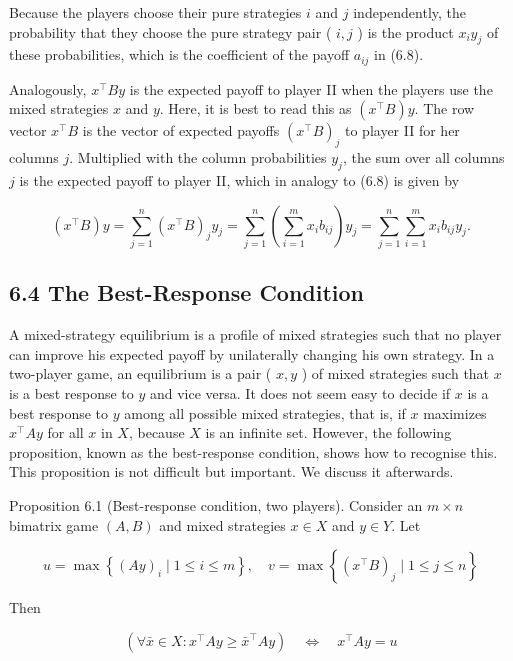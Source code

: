 \documentclass[12pt]{article}
\begin{document}
Because the players choose their pure strategies $i$ and $j$ independently, the probability that they choose the pure strategy pair ( $i, j$ ) is the product $x_{i} y_{j}$ of these probabilities, which is the coefficient of the payoff $a_{i j}$ in (6.8).

Analogously, $x^{\top} B y$ is the expected payoff to player II when the players use the mixed strategies $x$ and $y$. Here, it is best to read this as $\left(x^{\top} B\right) y$. The row vector $x^{\top} B$ is the vector of expected payoffs $\left(x^{\top} B\right)_{j}$ to player II for her columns $j$. Multiplied with the column probabilities $y_{j}$, the sum over all columns $j$ is the expected payoff to player II, which in analogy to (6.8) is given by

$$
\left(x^{\top} B\right) y=\sum_{j=1}^{n}\left(x^{\top} B\right)_{j} y_{j}=\sum_{j=1}^{n}\left(\sum_{i=1}^{m} x_{i} b_{i j}\right) y_{j}=\sum_{j=1}^{n} \sum_{i=1}^{m} x_{i} b_{i j} y_{j} .
$$

\subsection*{6.4 The Best-Response Condition}
A mixed-strategy equilibrium is a profile of mixed strategies such that no player can improve his expected payoff by unilaterally changing his own strategy. In a two-player game, an equilibrium is a pair ( $x, y$ ) of mixed strategies such that $x$ is a best response to $y$ and vice versa. It does not seem easy to decide if $x$ is a best response to $y$ among all possible mixed strategies, that is, if $x$ maximizes $x^{\top} A y$ for all $x$ in $X$, because $X$ is an infinite set. However, the following proposition, known as the best-response condition, shows how to recognise this. This proposition is not difficult but important. We discuss it afterwards.

Proposition 6.1 (Best-response condition, two players). Consider an $m \times n$ bimatrix game $(A, B)$ and mixed strategies $x \in X$ and $y \in Y$. Let


\begin{equation*}
u=\max \left\{(A y)_{i} \mid 1 \leq i \leq m\right\}, \quad v=\max \left\{\left(x^{\top} B\right)_{j} \mid 1 \leq j \leq n\right\} \tag{6.9}
\end{equation*}


Then


\begin{equation*}
\left(\forall \bar{x} \in X: x^{\top} A y \geq \bar{x}^{\top} A y\right) \quad \Leftrightarrow \quad x^{\top} A y=u \tag{6.10}
\end{equation*}
\end{document}
